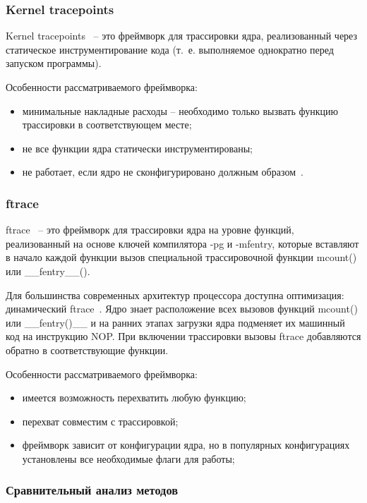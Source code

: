 \subsubsection{Kernel tracepoints}

Kernel tracepoints~\cite{kernel-tracepoints} -- это фреймворк для трассировки ядра, реализованный через статическое инструментирование кода (т.~е. выполняемое однократно перед запуском программы).

Особенности рассматриваемого фреймворка:

\begin{itemize}
	\item минимальные накладные расходы -- необходимо только вызвать функцию трассировки в соответствующем месте;
	\item не все функции ядра статически инструментированы; 
	\item не работает, если ядро не сконфигурировано должным образом~\cite{habr-profiling-linux}.
\end{itemize}

\subsubsection{ftrace}

ftrace~\cite{ftrace} -- это фреймворк для трассировки ядра на уровне функций, реализованный на основе ключей компилятора -pg и -mfentry, которые вставляют в начало каждой функции вызов специальной трассировочной функции mcount() или \_\_fentry\_\_().

Для большинства современных архитектур процессора доступна оптимизация: динамический ftrace~\cite{ftrace-habr}. Ядро знает расположение всех вызовов функций mcount() или \_\_fentry()\_\_ и на ранних этапах загрузки ядра подменяет их машинный код на инструкцию NOP. При включении трассировки вызовы ftrace добавляются обратно в соответствующие функции.

Особенности рассматриваемого фреймворка:

\begin{itemize}
	\item имеется возможность перехватить любую функцию;
	\item перехват совместим с трассировкой;
	\item фреймворк зависит от конфигурации ядра, но в популярных конфигурациях установлены все необходимые флаги для работы; 
\end{itemize}

\subsubsection{Сравнительный анализ методов}

